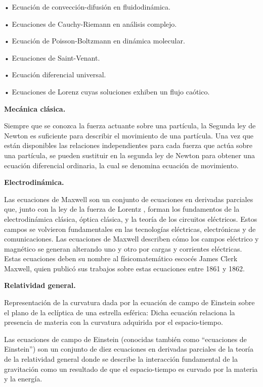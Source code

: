 \textcolor{gris}{•	Ecuación de convección-difusión en fluidodinámica.}

\textcolor{gris}{•	Ecuaciones de Cauchy-Riemann en análisis complejo.}

\textcolor{gris}{•	Ecuación de Poisson-Boltzmann en dinámica molecular.}

\textcolor{gris}{•	Ecuaciones de Saint-Venant.}

\textcolor{gris}{•	Ecuación diferencial universal.}

\textcolor{gris}{•	Ecuaciones de Lorenz cuyas soluciones exhiben un flujo caótico.}

\textcolor{gris}{\textbf{Mecánica clásica.}}


\textcolor{gris}{Siempre que se conozca la fuerza actuante sobre una partícula, la Segunda ley de Newton es suficiente para describir el movimiento de una partícula. Una vez que están disponibles las relaciones independientes para cada fuerza que actúa sobre una partícula, se pueden sustituir en la segunda ley de Newton para obtener una ecuación diferencial ordinaria, la cual se denomina ecuación de movimiento}.

\textcolor{gris}{\textbf{Electrodinámica.}}

\textcolor{gris}{Las ecuaciones de Maxwell son un conjunto de ecuaciones en derivadas parciales que, junto con la ley de la fuerza de Lorentz , forman los fundamentos de la electrodinámica clásica, óptica clásica, y la teoría de los circuitos eléctricos. Estos campos se volvieron fundamentales en las tecnologías eléctricas, electrónicas y de comunicaciones. Las ecuaciones de Maxwell describen cómo los campos eléctrico y magnético se generan alterando uno y otro por cargas y corrientes eléctricas. Estas ecuaciones deben su nombre al físicomatemático escocés James Clerk Maxwell, quien publicó sus trabajos sobre estas ecuaciones entre 1861 y 1862.}

\textcolor{gris}{\textbf{Relatividad general.}}

\textcolor{gris}{Representación de la curvatura dada por la ecuación de campo de Einstein sobre el plano de la eclíptica de una estrella esférica: Dicha ecuación relaciona la presencia de materia con la curvatura adquirida por el espacio-tiempo.}

\textcolor{gris}{Las ecuaciones de campo de Einstein (conocidas también como ``ecuaciones de Einstein'') son un conjunto de diez ecuaciones en derivadas parciales de la teoría de la relatividad general donde se describe la interacción fundamental de la gravitación como un resultado de que el espacio-tiempo es curvado por la materia y la energía.}
 
